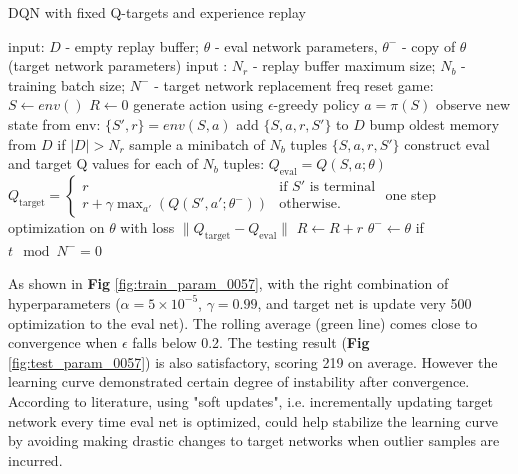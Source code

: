 \documentclass[10pt]{article}
\begin{document}
\begin{algorithm}
\caption{DQN with fixed Q-targets and experience replay}
\begin{algorithmic}
\STATE input: $D$ - empty replay buffer; $\theta$ - eval network parameters, $\theta^-$ - copy of $\theta$ (target network parameters)
\STATE input : $N_r$ - replay buffer maximum size; $N_b$ - training batch size; $N^-$ - target network replacement freq
\REPEAT
\STATE reset game: $S\leftarrow env()$
\STATE $R\leftarrow 0$
\STATE generate action using $\epsilon$-greedy policy $a=\pi(S)$
\STATE observe new state from env: $\{S',r\} = env(S,a)$
\STATE add $\{S,a,r,S'\}$ to $D$
\STATE bump oldest memory from $D$ if $|D|> N_r$
\STATE sample a minibatch of $N_b$ tuples $\{S,a,r,S'\}$ 
\STATE construct eval and target Q values for each of $N_b$ tuples:
\STATE $Q_{\text{eval}}=Q(S,a;\theta)$
\STATE $Q_{\text{target}}=\left\{
\begin{array}{lr}
             r & \text{if $S'$ is terminal} \\
             r+\gamma \max_{a'}(Q(S',a';\theta^-)) & \text{otherwise.}
\end{array}
\right.
$
\STATE one step optimization on $\theta$ with loss $\lVert Q_{\text{target}}-Q_{\text{eval}}\rVert$
\STATE $R\leftarrow R+r$
\STATE $\theta^- \leftarrow \theta$ if $t\mod N^- = 0$
\ENDFOR
{}
\end{algorithmic}
\end{algorithm}

As shown in \textbf{Fig} \ref{fig:train_param_0057}, with the right combination of hyperparameters ($\alpha=5\times 10^{-5}$, $\gamma=0.99$, and target net is update very 500 optimization to the eval net). The rolling average (green line) comes close to convergence when $\epsilon$ falls below 0.2. The testing result (\textbf{Fig} \ref{fig:test_param_0057}) is also satisfactory, scoring 219 on average. However the learning curve demonstrated certain degree of instability after convergence. According to literature, using "soft updates", i.e. incrementally updating target network every time eval net is optimized, could help stabilize the learning curve by avoiding making drastic changes to target networks when outlier samples are incurred.
\end{document}
